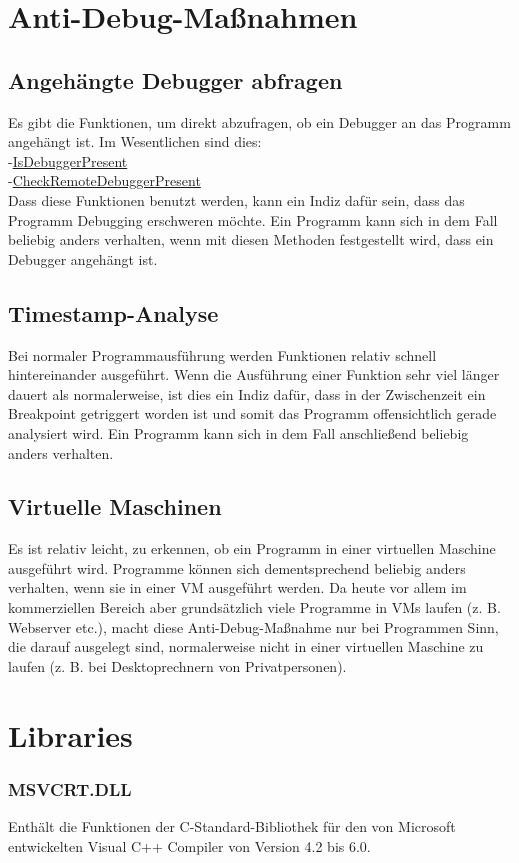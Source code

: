\begin{multicols}{3}
\section{Anti-Debug-Maßnahmen}
\subsection{Angehängte Debugger abfragen}
Es gibt die Funktionen, um direkt abzufragen, ob ein Debugger an das Programm angehängt ist. Im Wesentlichen sind dies:\\
-\href{https://msdn.microsoft.com/en-us/library/ms680345(VS.85).aspx}{IsDebuggerPresent} \\
-\href{https://msdn.microsoft.com/en-us/library/ms679280(VS.85).aspx}{CheckRemoteDebuggerPresent} \\
Dass diese Funktionen benutzt werden, kann ein Indiz dafür sein, dass das Programm Debugging erschweren möchte. Ein Programm kann sich in dem Fall beliebig anders verhalten, wenn mit diesen Methoden festgestellt wird, dass ein Debugger angehängt ist.
\subsection{Timestamp-Analyse}
Bei normaler Programmausführung werden Funktionen relativ schnell hintereinander ausgeführt. Wenn die Ausführung einer Funktion sehr viel länger dauert als normalerweise, ist dies ein Indiz dafür, dass in der Zwischenzeit ein Breakpoint getriggert worden ist und somit das Programm offensichtlich gerade analysiert wird. Ein Programm kann sich in dem Fall anschließend beliebig anders verhalten.
\subsection{Virtuelle Maschinen}
Es ist relativ leicht, zu erkennen, ob ein Programm in einer virtuellen Maschine ausgeführt wird. Programme können sich dementsprechend beliebig anders verhalten, wenn sie in einer VM ausgeführt werden. Da heute vor allem im kommerziellen Bereich aber grundsätzlich viele Programme in VMs laufen (z. B. Webserver etc.), macht diese Anti-Debug-Maßnahme nur bei Programmen Sinn, die darauf ausgelegt sind, normalerweise nicht in einer virtuellen Maschine zu laufen (z. B. bei Desktoprechnern von Privatpersonen).
\section{Libraries}
\subsubsection{MSVCRT.DLL}
Enthält die Funktionen der C-Standard-Bibliothek für den von Microsoft entwickelten Visual C++ Compiler von Version 4.2 bis 6.0.

\end{multicols}
